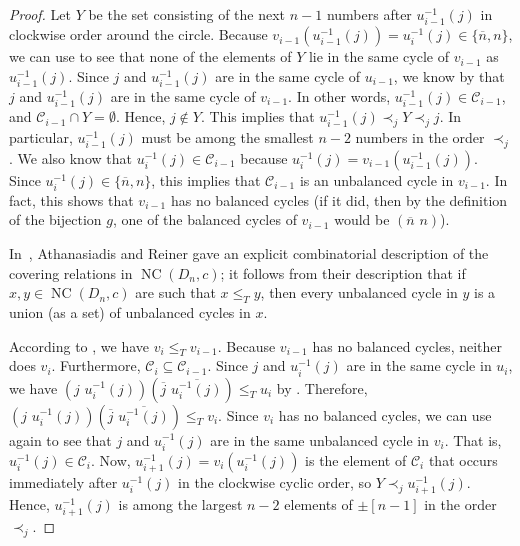 \documentclass[10pt,a4paper]{amsart}
\DeclareMathOperator{\NC}{NC}
\begin{document}
\begin{proof}
Let $Y$ be the set consisting of the next $n-1$ numbers after $u_{i-1}^{-1}(j)$ in clockwise order around the circle. Because $v_{i-1}(u_{i-1}^{-1}(j))=u_i^{-1}(j)\in\{\overline n,n\}$, we can use  to see that none of the elements of $Y$ lie in the same cycle of $v_{i-1}$ as $u_{i-1}^{-1}(j)$. Since $j$ and $u_{i-1}^{-1}(j)$ are in the same cycle of $u_{i-1}$, we know by  that $j$ and $u_{i-1}^{-1}(j)$ are in the same cycle of $v_{i-1}$. In other words, $u_{i-1}^{-1}(j)\in\mathcal C_{i-1}$, and $\mathcal C_{i-1}\cap Y=\emptyset$. Hence, $j\not\in Y$. This implies that $u_{i-1}^{-1}(j)\prec_j Y\prec_j j$. In particular, $u_{i-1}^{-1}(j)$ must be among the smallest $n-2$ numbers in the order $\prec_j$. We also know that $u_i^{-1}(j)\in\mathcal C_{i-1}$ because $u_i^{-1}(j)=v_{i-1}(u_{i-1}^{-1}(j))$. Since $u_i^{-1}(j)\in\{\overline n,n\}$, this implies that $\mathcal C_{i-1}$ is an unbalanced cycle in $v_{i-1}$. In fact, this shows that $v_{i-1}$ has no balanced cycles (if it did, then by the definition of the bijection $g$, one of the balanced cycles of $v_{i-1}$ would be $(\overline n\,\, n)$).  

In~\cite{AthanasiadisReiner}, Athanasiadis and Reiner gave an explicit combinatorial description of the covering relations in $\NC(D_n,c)$; it follows from their description that if $x,y\in\NC(D_n,c)$ are such that $x\leq_T y$, then every unbalanced cycle in $y$ is a union (as a set) of unbalanced cycles in $x$.

According to , we have $v_i\leq_T v_{i-1}$. Because $v_{i-1}$ has no balanced cycles, neither does $v_i$. Furthermore, $\mathcal C_i\subseteq \mathcal C_{i-1}$.  Since $j$ and $u_i^{-1}(j)$ are in the same cycle in $u_i$, we have $(j\,\,u_i^{-1}(j))(\overline j\,\,\overline{u_i^{-1}(j)})\leq_T u_i$ by . Therefore, $(j\,\,u_i^{-1}(j))(\overline j\,\,\overline{u_i^{-1}(j)})\leq_T v_i$. Since $v_i$ has no balanced cycles, we can use  again to see that $j$ and $u_i^{-1}(j)$ are in the same unbalanced cycle in $v_i$. That is, $u_i^{-1}(j)\in\mathcal C_i$. Now, $u_{i+1}^{-1}(j)=v_i(u_i^{-1}(j))$ is the element of $\mathcal C_i$ that occurs immediately after $u_i^{-1}(j)$ in the clockwise cyclic order, so $Y\prec_j u_{i+1}^{-1}(j)$. Hence, $u_{i+1}^{-1}(j)$ is among the largest $n-2$ elements of $\pm[n-1]$ in the order $\prec_j$.  


\end{proof}
\end{document}
